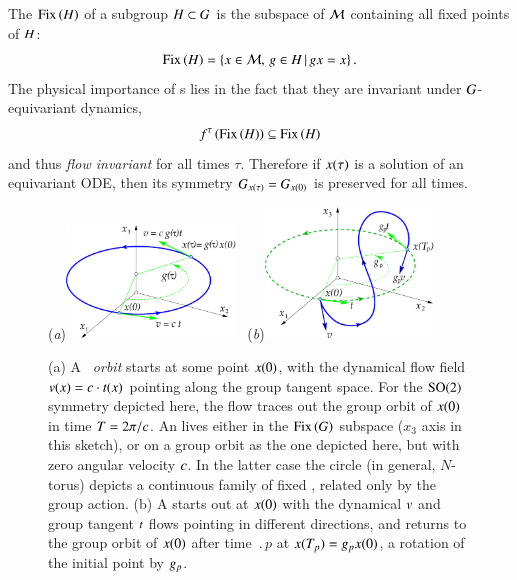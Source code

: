 \documentclass[final,number,sort&compress]{elsarticle}
\begin{document}
The \emph{\fixedsp} $\mathrm{Fix}\left(H\right)$ of a subgroup
$H\subset G$ is the subspace of ${\cal M}$ containing
all fixed points of $H$:
\[
	\mathrm{Fix}\left(H\right)=
      \{x\in{\cal M},\,g\in H \,|\,
        g x = x \}
\,.
\]
The physical importance of \fixedsp s lies in the fact that
they are in\-vari\-ant under $G$-equi\-vari\-ant
dynamics,
\[
 f^\tau\left(\mathrm{Fix}\left(H\right)\right)\subseteq \mathrm{Fix}\left(H\right)
\]
and thus \emph{flow in\-vari\-ant} for all times $\tau$.
Therefore if $x(\tau)$ is a solution of an equi\-vari\-ant ODE,
then its symmetry $G_{x(\tau)}=G_{x(0)}$ is
preserved for all times.

%
\begin{figure}[ht]
 (\textit{a})\includegraphics[width=0.40\textwidth,clip=true]{reqv}
~(\textit{b})\includegraphics[width=0.40\textwidth,clip=true]{rpo}
\caption{
(a) A {\em \reqv\ orbit} starts at some point $x(0)$,
with the dynamical flow field $v(x) = c \cdot
t(x)$ pointing along the group tangent space. For
the $\textrm{SO}(2)$ symmetry depicted here, the flow traces out the
group orbit of $x(0)$ in time ${T_{}}=2\pi/c$.
An
{\em \eqv} lives either in the $\mathrm{Fix}\left(G\right)$ subspace
($x_3$ axis in this sketch), or on a group orbit as the one
depicted here, but with zero angular velocity $c$. In
the latter case the circle (in general, $N$-torus) depicts a
continuous family of fixed \eqva, related only by the group
action.
(b) A {\em \rpo} starts out at $x(0)$ with the dynamical $v$ and
group tangent $t$ flows pointing in different
directions, and returns to the group orbit of $x(0)$ after
time $\period{p}$ at $x({T_{p}})=g_p x (0)$, a
rotation of the initial point by $g_p$.
}
\label{f:rpo}
\end{figure}
\end{document}
